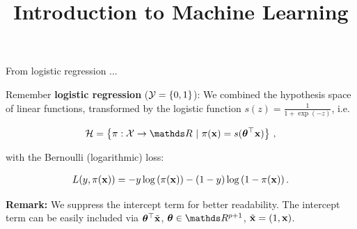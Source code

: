 \documentclass[11pt,compress,t,notes=noshow, xcolor=table]{beamer}
\title{Introduction to Machine Learning}
\begin{document}
    

\begin{vbframe}{From logistic regression ...}

Remember \textbf{logistic regression} ($\mathcal{Y} = \{0, 1\}$): We combined the hypothesis space of linear functions, transformed by the logistic function $s(z) = \frac{1}{1 + \exp(- z)}$, i.e.\

\vspace*{-0.3cm}

\begin{eqnarray*}
  \Hspace = \left\{\pi: \Xspace \to \R ~|~\pix = s(\thetav^\top \xv)\right\}\,,
\end{eqnarray*}

with the Bernoulli (logarithmic) loss: 

\begin{eqnarray*}
  L(y, \pi(\mathbf{x})) = -y \log \left(\pi(\mathbf{x})\right) - (1 - y) \log \left(1 - \pi(\mathbf{x})\right).
\end{eqnarray*}

\vfill

\begin{footnotesize}
  \textbf{Remark:} We suppress the intercept term for better readability. The intercept term can be easily included via $\bm{\theta}^\top \tilde{\mathbf{x}}$, $\thetav \in \R^{p + 1}$, $\tilde{\mathbf{x}} = (1, \mathbf{x})$.
\end{footnotesize}

\end{vbframe}
\end{document}
